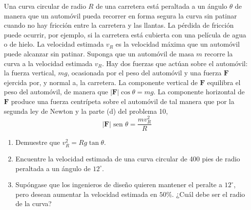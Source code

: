 \item Una curva circular de radio $R$ de una carretera está peraltada a un ángulo $\theta$ de manera que un automóvil pueda recorrer en forma segura la curva sin patinar cuando no hay fricción entre la carretera y las llantas. La pérdida de fricción puede ocurrir, por ejemplo, si la carretera está cubierta con una película de agua o de hielo. La velocidad estimada $v_R$ es la velocidad máxima que un automóvil puede alcanzar sin patinar. Suponga que un automóvil de masa $m$ recorre la curva a la velocidad estimada $v_R$. Hay dos fuerzas que actúan sobre el automóvil: la fuerza vertical, $mg$, ocasionada por el peso del automóvil y una fuerza $\mathbf{F}$ ejercida por, y normal a, la carretera.
    La componente vertical de $\mathbf{F}$ equilibra el peso del automóvil, de manera que $|\mathbf{F}| \cos \theta = mg$. La componente horizontal de $\mathbf{F}$ produce una fuerza centrípeta sobre el automóvil de tal manera que por la segunda ley de Newton y la parte (d) del problema 10,
    \[
    |\mathbf{F}| \text{ sen } \theta = \frac{m v_R^2}{R}
    \]
    \begin{enumerate}
        \item Demuestre que $v_R^2 = R g \tan \theta$.
        \item Encuentre la velocidad estimada de una curva circular de 400 pies de radio peraltada a un ángulo de $12^\circ$.
        \item Supóngase que los ingenieros de diseño quieren mantener el peralte a $12^\circ$, pero desean aumentar la velocidad estimada en $50\%$. ¿Cuál debe ser el radio de la curva?
    \end{enumerate}
